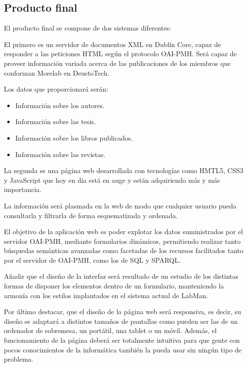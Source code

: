 \subsection{Producto final}

El producto final se compone de dos sistemas diferentes:

El primero es un servidor de documentos XML en Dublín Core, capaz de responder a las peticiones HTML según el protocolo OAI-PMH. Será capaz de proveer información variada acerca de las publicaciones de los miembros que conforman Morelab en DeustoTech.

Los datos que proporcionará serán:

\begin{itemize}
	\item Información sobre los autores.
	\item Información sobre las tesis.
	\item Información sobre los libros publicados.
	\item Información sobre las revistas.
\end{itemize}

La segunda es una página web desarrollada con tecnologías como HMTL5, CSS3 y JavaScript que hoy en día está en auge y están adquiriendo más y más importancia.

La información será plasmada en la web de modo que cualquier usuario pueda consultarla y filtrarla de forma esquematizada y ordenada.

El objetivo de la aplicación web es poder explotar los datos suministrados por el servidor OAI-PMH, mediante formularios dinámicos, permitiendo realizar tanto búsquedas semánticas avanzadas como facetadas de los recursos facilitados tanto por el servidor de OAI-PMH, como los de SQL y SPARQL.

Añadir que el diseño de la interfaz será resultado de un estudio de los distintas formas de disponer los elementos dentro de un formulario, manteniendo la armonía con los estilos implantados en el sistema actual de LabMan.

Por último destacar, que el diseño de la página web será responsiva, es decir, su diseño se adaptará a distintos tamaños de pantallas como pueden ser las de un ordenador de sobremesa, un portátil, una tablet o un móvil. Además, el funcionamiento de la página deberá ser totalmente intuitiva para que gente con pocos conocimientos de la informática también la pueda usar sin ningún tipo de problema.